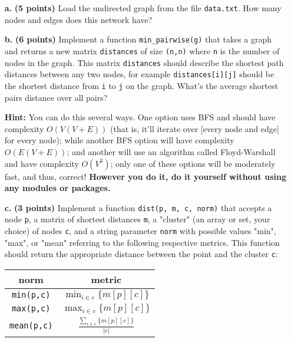 \documentclass[11pt]{article}
\newcommand{\code}[1]{\texttt{#1}}
\begin{document}
\begin{enumerate}
    \item[\textbf{a.}] \textbf{(5 points)} Load the undirected graph from the file \code{data.txt}. How many nodes and edges does this network have?

    \item[\textbf{b.}] \textbf{(6 points)} Implement a function \code{min\_pairwise(g)} that takes a graph and returns a new matrix \code{distances} of size \code{(n,n)} where \code{n} is the number of nodes in the graph. This matrix \code{distances} should describe the shortest path distances between any two nodes, for example \code{distances[i][j]} should be the shortest distance from \code{i} to \code{j} on the graph. What's the average shortest pairs distance over all pairs?

    \textbf{Hint:} You can do this several ways. One option uses BFS and should have complexity $O(V(V+E))$ (that is, it'll iterate over [every node and edge] for every node); while another BFS option will have complexity $O(E(V+E))$; and another will use an algorithm called Floyd-Warshall and have complexity $O(V^3)$; only one of these options will be moderately fast, and thus, correct! \textbf{However you do it, do it yourself without using any modules or packages.}

    \item[\textbf{c.}] \textbf{(3 points)} Implement a function \code{dist(p, m, c, norm)} that accepts a node \code{p}, a matrix of shortest distances \code{m}, a "cluster" (an array or set, your choice) of nodes \code{c}, and a string parameter \code{norm} with possible values "min", "max", or "mean" referring to the following respective metrics. This function should return the appropriate distance between the point and the cluster \code{c}:

    \begin{center}
        \begin{tabular}{| c | c |}
            \hline
            norm & metric\\
            \hline
            \code{min(p,c)} & $\min_{i\in c}\{m[p][c]\}$\\
            \hline
            \code{max(p,c)} & $\max_{i\in c}\{m[p][c]\}$\\
            \hline
            \code{mean(p,c)} & $\frac{\sum_{i\in c}\{m[p][c]\}}{|c|}$\\
            \hline
        \end{tabular}
    \end{center}


\end{enumerate}
\end{document}
